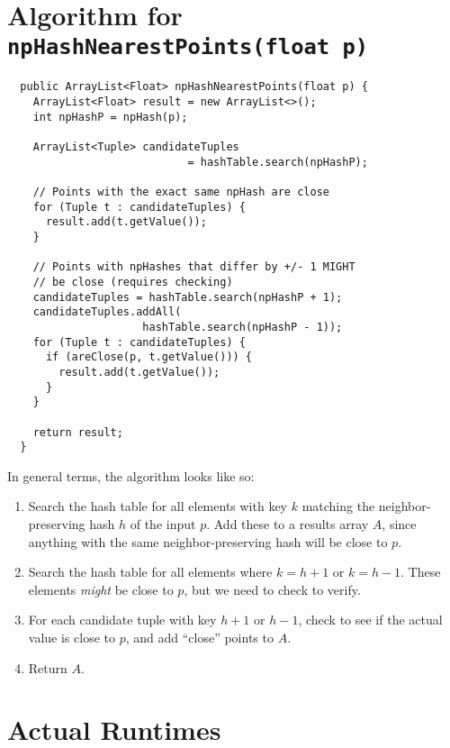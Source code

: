 \documentclass[12pt]{article}
\begin{document}
  

\pagebreak
\section{Algorithm for
  \lstinline[basicstyle=\ttfamily\Large]
  |npHashNearestPoints(float p)|}

\begin{lstlisting}
  public ArrayList<Float> npHashNearestPoints(float p) {
    ArrayList<Float> result = new ArrayList<>();
    int npHashP = npHash(p);

    ArrayList<Tuple> candidateTuples
                            = hashTable.search(npHashP);

    // Points with the exact same npHash are close
    for (Tuple t : candidateTuples) {
      result.add(t.getValue());
    }

    // Points with npHashes that differ by +/- 1 MIGHT
    // be close (requires checking)
    candidateTuples = hashTable.search(npHashP + 1);
    candidateTuples.addAll(
                     hashTable.search(npHashP - 1));
    for (Tuple t : candidateTuples) {
      if (areClose(p, t.getValue())) {
        result.add(t.getValue());
      }
    }

    return result;
  }
\end{lstlisting}

In general terms, the algorithm looks like so:

\begin{enumerate}
\item Search the hash table for all elements with key $k$ matching the
  neighbor-preserving hash $h$ of the input $p$. Add these to
  a results array $A$, since anything with the same neighbor-preserving
  hash will be close to $p$.
\item Search the hash table for all elements where $k = h+1$ or $k=h-1$.
  These elements \textit{might} be close to $p$, but we need to check
  to verify.
\item For each candidate tuple with key $h+1$ or $h-1$, check to see
  if the actual value is close to $p$, and add ``close'' points to $A$.
  \item Return $A$.
\end{enumerate}




\pagebreak
\section{Actual Runtimes}
\end{document}
